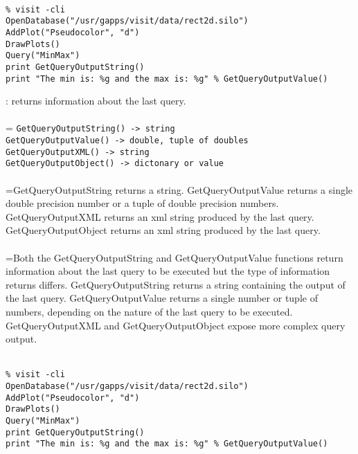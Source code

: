 \documentclass[10pt,a4paper]{report}
\begin{document}
\\[-6mm]
\begin{verbatim}% visit -cli
OpenDatabase("/usr/gapps/visit/data/rect2d.silo")
AddPlot("Pseudocolor", "d")
DrawPlots()
Query("MinMax")
print GetQueryOutputString()
print "The min is: %g and the max is: %g" % GetQueryOutputValue()
\end{verbatim}
\newpage


{}
: returns information about the last query.\\[-3mm]

 \\ 
\hangindent=\parindent 
\verb!GetQueryOutputString() -> string!\\ 
\verb!GetQueryOutputValue() -> double, tuple of doubles!\\ 
\verb!GetQueryOutputXML() -> string!\\ 
\verb!GetQueryOutputObject() -> dictonary or value!\\ [-3mm]

 \\ 
\hangindent=\parindent GetQueryOutputString returns a string. GetQueryOutputValue returns a single double precision number or a tuple of double precision numbers. GetQueryOutputXML returns an xml string produced by the last query. GetQueryOutputObject returns an xml string produced by the last query. \\[-3mm] 

 \\ 
\hangindent=\parindent Both the GetQueryOutputString and GetQueryOutputValue functions return information about the last query to be executed but the type of information returns differs. GetQueryOutputString returns a string containing the output of the last query. GetQueryOutputValue returns a single number or tuple of numbers, depending on the nature of the last query to be executed.  GetQueryOutputXML and GetQueryOutputObject expose more complex query output. \\[-3mm] 

\\[-6mm]
\begin{verbatim}% visit -cli
OpenDatabase("/usr/gapps/visit/data/rect2d.silo")
AddPlot("Pseudocolor", "d")
DrawPlots()
Query("MinMax")
print GetQueryOutputString()
print "The min is: %g and the max is: %g" % GetQueryOutputValue()
\end{verbatim}
\newpage
\end{document}
